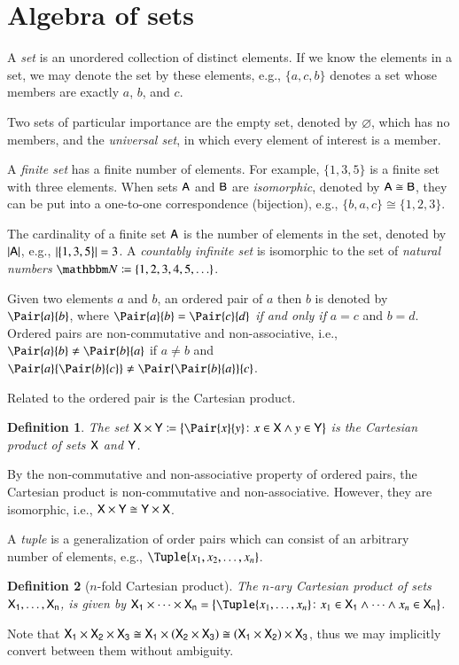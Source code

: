 \documentclass[10pt,final,hidelinks]{article}
\numberwithin{equation}{section}
\DeclarePairedDelimiter\Card{\lvert}{\rvert}
\newcommand{\EmptySet}{\varnothing}
\newcommand{\NatSet}{\BlackboardSet{N}}
\newcommand{\envnumstyle}{chapter}
\renewcommand{\envnumstyle}{chapter}
\renewcommand{\envnumstyle}{section}
\theoremstyle{plain}
\newtheorem{definition}{Definition}[\envnumstyle]
\begin{document}
\section{Algebra of sets} 
\label{sec:setalgebra}
A \emph{set} is an unordered collection of distinct elements.
If we know the elements in a set, we may denote the set by these elements, e.g., $\{a,c,b\}$ denotes a set whose members are exactly $a$, $b$, and $c$.

Two sets of particular importance are the empty set, denoted by $\EmptySet$, which has no members, and the \emph{universal set}, in which every element of interest is a member.

A \emph{finite set} has a finite number of elements.
For example, $\{ 1, 3, 5 \}$ is a finite set with three elements.
When sets $\Set{A}$ and $\Set{B}$ are \emph{isomorphic}, denoted by $\Set{A} 
\cong \Set{B}$, they can be put into a one-to-one correspondence (bijection), e.g., $\{b,a,c\} \cong \{1,2,3\}$.

The cardinality of a finite set $\Set{A}$ is the number of elements in the set, denoted by $\Card{\Set{A}}$, e.g., $\Card{\left\{ 1, 3, 5\right\}} = 3$.
A \emph{countably infinite set} is isomorphic to the set of \emph{natural numbers} $\NatSet \coloneqq \{1,2,3,4,5,\ldots\}$.


Given two elements $a$ and $b$, an ordered pair of $a$ then $b$ is denoted by $\Pair{a}{b}$, where $\Pair{a}{b} = \Pair{c}{d}$ \emph{if and only if} $a = c$ and $b = d$.
Ordered pairs are non-commutative and non-associative, i.e., $\Pair{a}{b} \neq \Pair{b}{a}$ if $a \neq b$ and $\Pair{a}{\Pair{b}{c}} \neq \Pair{\Pair{b}{a}}{c}$.

Related to the ordered pair is the Cartesian product.
\begin{definition}
	The set $\Set{X} \times \Set{Y} \coloneqq \left\{\Pair{x}{y} \colon x \in 
	\Set{X} \land y \in \Set{Y}\right\}$ is the Cartesian product of sets $\Set{X}$ 
	and $\Set{Y}$.
\end{definition}
By the non-commutative and non-associative property of ordered pairs, the Cartesian product is non-commutative and non-associative.
However, they are isomorphic, i.e., $\Set{X} \times \Set{Y} \cong \Set{Y} \times \Set{X}$.

A \emph{tuple} is a generalization of order pairs which can consist of an arbitrary number of elements, e.g., $\Tuple{x_1,x_2,\ldots,x_n}$.
\begin{definition}[$n$-fold Cartesian product]
	The $n$-ary Cartesian product of sets $\Set{X}[1],\ldots,\Set{X}[n]$, is given by $\Set{X}[1] \times \cdots \times \Set{X}[n] = \left\{\Tuple{x_1,\ldots,x_n} \colon x_1 \in \Set{X}[1] \land \cdots \land x_n \in \Set{X}[n]\right\}$.
\end{definition}
Note that
	$\Set{X}[1] \times \Set{X}[2] \times \Set{X}[3] \cong \Set{X}[1] \times \left(\Set{X}[2] \times \Set{X}[3]\right) \cong \left(\Set{X}[1] \times \Set{X}[2]\right) \times \Set{X}[3]$,
thus we may implicitly convert between them without ambiguity.
\end{document}
